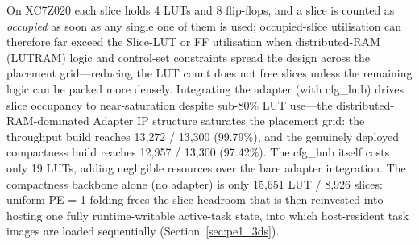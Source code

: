 \documentclass[12pt, a4paper]{report}
\numberwithin{equation}{chapter}
\numberwithin{figure}{chapter}
\numberwithin{table}{chapter}
\numberwithin{algorithm}{chapter}
\begin{document}
\begin{table}[H]
\centering
\caption{FPGA Resource Utilisation Across Four MARS Build Configurations.}
\label{tab:resource_compare}
\renewcommand{\arraystretch}{1.2}%
\begin{flushleft}
\footnotesize On XC7Z020 each slice holds 4 LUTs and 8 flip-flops, and a slice is counted as \emph{occupied} as soon as any single one of them is used; occupied-slice utilisation can therefore far exceed the Slice-LUT or FF utilisation when distributed-RAM (LUTRAM) logic and control-set constraints spread the design across the placement grid---reducing the LUT count does not free slices unless the remaining logic can be packed more densely. Integrating the adapter (with cfg\_hub) drives slice occupancy to near-saturation despite sub-80\% LUT use---the distributed-RAM-dominated Adapter IP structure saturates the placement grid: the throughput build reaches 13{,}272 / 13{,}300 (99.79\%), and the genuinely deployed compactness build reaches 12{,}957 / 13{,}300 (97.42\%). The cfg\_hub itself costs only 19 LUTs, adding negligible resources over the bare adapter integration. The compactness backbone alone (no adapter) is only 15{,}651 LUT / 8{,}926 slices: uniform PE = 1 folding frees the slice headroom that is then reinvested into hosting one fully runtime-writable active-task state, into which host-resident task images are loaded sequentially (Section~\ref{sec:pe1_3ds}).
\end{flushleft}
\end{table}
\end{document}
